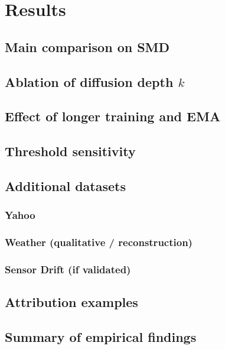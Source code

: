 \chapter{Results}
\label{ch:results}

\section{Main comparison on SMD}

\section{Ablation of diffusion depth $k$}

\section{Effect of longer training and EMA}

\section{Threshold sensitivity}

\section{Additional datasets}
\subsection{Yahoo}
\subsection{Weather (qualitative / reconstruction)}
\subsection{Sensor Drift (if validated)}

\section{Attribution examples}

\section{Summary of empirical findings}
